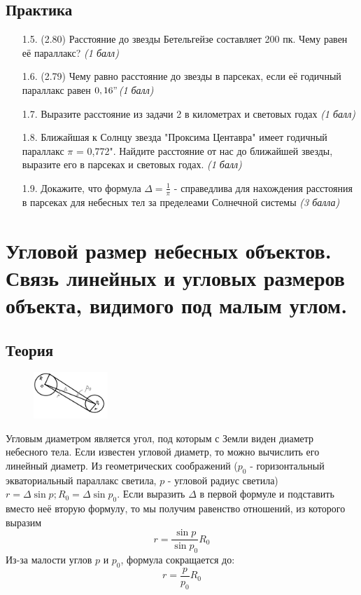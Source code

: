 \documentclass[16pt,a4paper]{report}
\begin{document}
\subsection{Практика}
\begin{enumerate}
    \item [1.5.] (2.80) Расстояние до звезды Бетельгейзе составляет 200 пк. Чему равен её параллакс? \emph{(1 балл)}
    \item [1.6.] (2.79) Чему равно расстояние до звезды в парсеках, если её годичный параллакс равен $0,16"$\emph{(1 балл)}
    \item [1.7.]Выразите расстояние из задачи 2 в километрах и световых годах \emph{(1 балл)}
    \item [1.8.] Ближайшая к Солнцу звезда "Проксима Центавра" имеет годичный параллакс $\pi$ = 0,772". Найдите расстояние от нас до ближайшей звезды, выразите его в парсеках и световых годах. \emph{(1 балл)}
    \item [1.9.] Докажите, что формула $\Delta = \frac{1}{\pi }$ - справедлива для нахождения расстояния в парсеках для небесных тел за пределеами Солнечной системы \emph{(3 балла)}
\end{enumerate}
\section{Угловой размер небесных объектов. Связь линейных и угловых размеров объекта, видимого под малым углом.}
\subsection{Теория}
\begin{figure} %
    \centering
    \includegraphics[width=0.25\textwidth]{kismereniu.png}
\end{figure}
Угловым диаметром является угол, под которым с Земли виден диаметр небесного тела. Если известен угловой диаметр, то можно вычислить его линейный диаметр. Из геометрических соображений ($p_0$ - горизонтальный экваториальный параллакс светила, $p$ - угловой радиус светила) $r = \Delta \sin{p}; R_0 = \Delta \sin{p_0}$. Если выразить $\Delta$ в первой формуле и подставить вместо неё вторую формулу, то мы получим равенство отношений, из которого выразим $$r = \frac{\sin{p}}{\sin{p_0}}R_0$$
Из-за малости углов $p$ и $p_0$, формула сокращается до: $$r = \frac{p}{p_0}R_0$$
\end{document}
